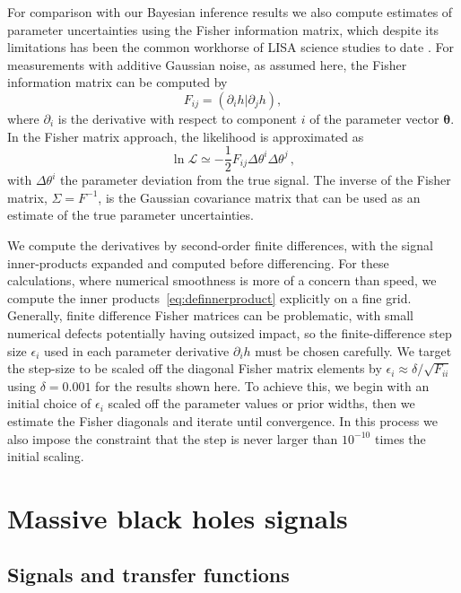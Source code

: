 \documentclass[aps,showpacs,twocolumn,prd,superscriptaddress,nofootinbib]{revtex4-1}
\newcommand{\be}{\begin{equation}}
\newcommand{\ee}{\end{equation}}
\newcommand\calL{{\mathcal{L}}}
\begin{document}
For comparison with our Bayesian inference results we also compute estimates of parameter uncertainties using the Fisher information matrix, which despite its limitations has been the common workhorse of LISA science studies to date \cite{Vallisneri08}. For measurements with additive Gaussian noise, as assumed here, the Fisher information matrix can be computed by
\be
	F_{ij} = \left( \partial_{i} h | \partial_{j} h \right),
\ee
where $\partial_i$ is the derivative with respect to component $i$ of the parameter vector $\bm{\theta}$. In the Fisher matrix approach, the likelihood is approximated as
\be
	\ln \calL \simeq -\frac{1}{2} F_{ij} \Delta \theta^{i} \Delta \theta^{j} \,,
\ee
with $\Delta \theta^{i}$ the parameter deviation from the true signal. The inverse of the Fisher matrix, $\Sigma = F^{-1}$, is the Gaussian covariance matrix that can be used as an estimate of the true parameter uncertainties.

We compute the derivatives by second-order finite differences, with the signal inner-products expanded and computed before differencing. For these calculations, where numerical smoothness is more of a concern than speed, we compute the inner products~\eqref{eq:definnerproduct} explicitly on a fine grid. Generally, finite difference Fisher matrices can be problematic, with small numerical defects potentially having outsized impact, so the finite-difference step size $\epsilon_i$ used in each parameter derivative $\partial_{i}h$ must be chosen carefully. We target the step-size to be scaled off the diagonal Fisher matrix elements by ${\epsilon_i}\approx\delta/\sqrt{F_{ii}}$ using $\delta=0.001$ for the results shown here.
To achieve this, we begin with an initial choice of $\epsilon_i$ scaled off the parameter values or prior widths, then we estimate the Fisher diagonals and iterate until convergence.
In this process we also impose the constraint that the step is never larger than $10^{-10}$ times the initial scaling.


\section{Massive black holes signals}
\label{sec:SMBH}


\subsection{Signals and transfer functions}
\label{sec:signaltransfer}
\end{document}

